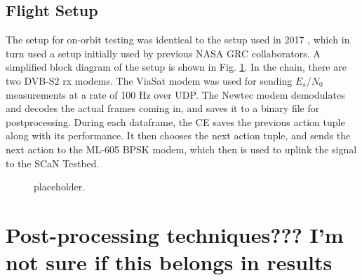 \subsection{Flight Setup}
\par The setup for on-orbit testing was identical to the setup used in 2017 \cite{tim_implementation}, which in turn used a setup initially used by previous NASA GRC collaborators. A simplified block diagram of the setup is shown in Fig. \ref{methods:flightTestFig}. In the chain, there are two DVB-S2 rx modems. The ViaSat modem was used for sending $E_s/N_0$ measurements at a rate of 100 Hz over UDP. The Newtec modem demodulates and decodes the actual frames coming in, and saves it to a binary file for postprocessing. During each dataframe, the CE saves the previous action tuple along with its performance. It then chooses the next action tuple, and sends the next action to the ML-605 BPSK modem, which then is used to uplink the signal to the SCaN Testbed.

\begin{figure}[ht]
\caption{placeholder.}\label{methods:flightTestFig}
\end{figure} 

\section{Post-processing techniques??? I'm not sure if this belongs in results}
